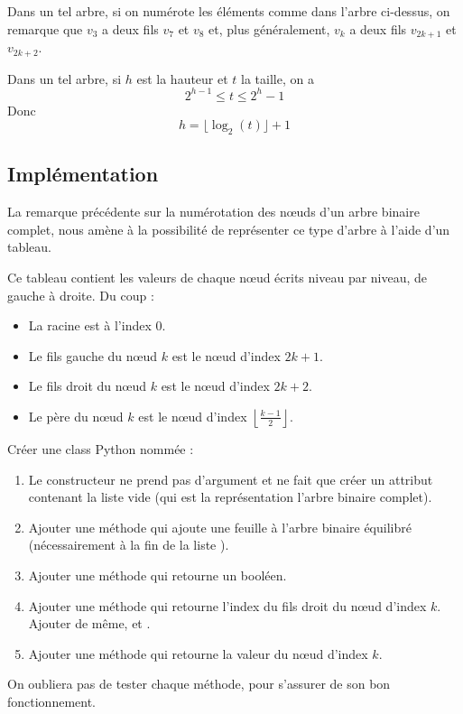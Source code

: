 \documentclass[11pt,a4paper,french,twoside]{PMCours}
\begin{document}
\begin{Remarque}{}
    Dans un tel arbre, si on numérote les éléments comme dans l'arbre ci-dessus,
    on remarque que $v_3$ a deux fils $v_7$ et $v_8$ et, plus généralement, $v_k$
    a deux fils $v_{2k+1}$ et $v_{2k+2}$.
\end{Remarque}

\begin{Remarque}{}
    Dans un tel arbre, si $h$ est la hauteur et $t$ la taille, on a
    \[2^{h-1}\leq t\leq 2^h-1\]
    Donc
    \[h=\lfloor\log_2(t)\rfloor+1\]
\end{Remarque}

\subsection{Implémentation}

La remarque précédente sur la numérotation des nœuds d'un arbre binaire complet,
nous amène à la possibilité de représenter ce type d'arbre à l'aide d'un tableau.

Ce tableau contient les valeurs de chaque nœud écrits niveau par niveau, 
de gauche à droite. Du coup :
\begin{itemize}
    \item La racine est à l'index $0$.
    \item Le fils gauche du nœud $k$ est le nœud d'index $2k+1$.
    \item Le fils droit du nœud $k$ est le nœud d'index $2k+2$.
    \item Le père du nœud $k$ est le nœud d'index $\left\lfloor\frac{k-1}{2}\right\rfloor$.
\end{itemize}

\begin{Exercice}{}
Créer une class Python nommée  :
\begin{enumerate}
    \item Le constructeur  ne prend pas d'argument et ne fait que
    créer un attribut  contenant la liste vide (qui est la représentation
    l'arbre binaire complet).
    \item Ajouter une méthode  qui ajoute une feuille
    à l'arbre binaire équilibré (nécessairement à la fin de la liste ).
    \item Ajouter une méthode  qui retourne un booléen.       
    \item Ajouter une méthode  qui retourne l'index
    du fils droit du nœud d'index $k$. Ajouter de même, 
    et .
    \item Ajouter une méthode  qui retourne la valeur du 
    nœud d'index $k$.
\end{enumerate}
On oubliera pas de tester chaque méthode, pour s'assurer de son bon fonctionnement.
\end{Exercice}
\end{document}
